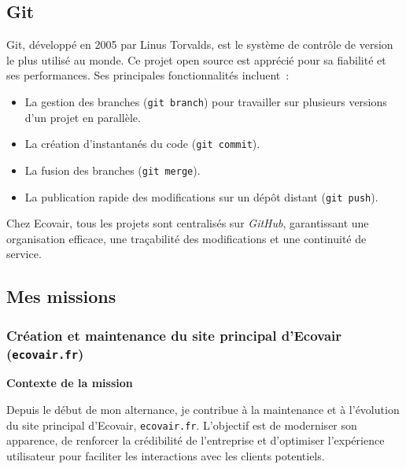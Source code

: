\subsection{Git}

Git, développé en 2005 par Linus Torvalds, est le système de contrôle de version le plus utilisé au monde. Ce projet open source est apprécié pour sa fiabilité et ses performances. Ses principales fonctionnalités incluent~:\vspace{0.3cm}

\begin{itemize}
    \item La gestion des branches (\texttt{git branch}) pour travailler sur plusieurs versions d’un projet en parallèle.\vspace{0.3cm}
    \item La création d’instantanés du code (\texttt{git commit}).\vspace{0.3cm}
    \item La fusion des branches (\texttt{git merge}).\vspace{0.3cm}
    \item La publication rapide des modifications sur un dépôt distant (\texttt{git push}).\vspace{0.3cm}
\end{itemize}

Chez Ecovair, tous les projets sont centralisés sur \textit{GitHub}, garantissant une organisation efficace, une traçabilité des modifications et une continuité de service.

\subsection{Mes missions}

\subsubsection{Création et maintenance du site principal d’Ecovair (\texttt{ecovair.fr})}

\textbf{Contexte de la mission}\vspace{0.3cm}

Depuis le début de mon alternance, je contribue à la maintenance et à l’évolution du site principal d’Ecovair, \texttt{ecovair.fr}. L’objectif est de moderniser son apparence, de renforcer la crédibilité de l’entreprise et d’optimiser l’expérience utilisateur pour faciliter les interactions avec les clients potentiels.\vspace{0.3cm}

